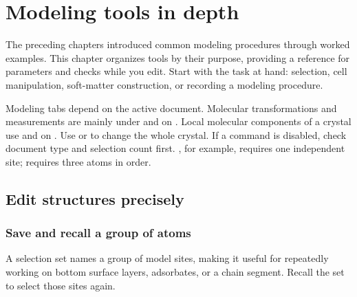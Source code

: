 \chapter{Modeling tools in depth}\label{ch:modeling-tools}\label{sec:modeling-reference}

The preceding chapters introduced common modeling procedures through worked examples. This chapter organizes tools by their purpose, providing a reference for parameters and checks while you edit. Start with the task at hand: selection, cell manipulation, soft-matter construction, or recording a modeling procedure.

Modeling tabs depend on the active document. Molecular transformations and measurements are mainly under  and  on . Local molecular components of a crystal use  and  on . Use  or  to change the whole crystal. If a command is disabled, check document type and selection count first. , for example, requires one independent site;  requires three atoms in order.

\section{Edit structures precisely}

\subsection{Save and recall a group of atoms}\label{sec:selection-set-workflow}

A selection set names a group of model sites, making it useful for repeatedly working on bottom surface layers, adsorbates, or a chain segment. Recall the set to select those sites again.

